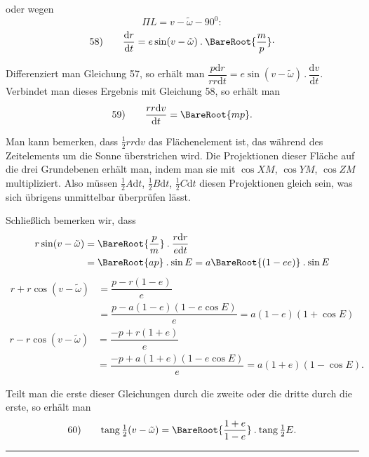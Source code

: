 oder wegen
\[
\Pi L=v-\tilde\omega-90^{0}:
\]
\[
\begin{array}{rl}58)\quad&\dfrac{\mathrm{d}r}{\mathrm{d}t}=e\sin(v-\tilde\omega)\mathbin{.}\BareRoot{\dfrac{m}{p}}\mathpunct{\cdot}\end{array}
\]
\par Differenziert man Gleichung 57, so erhält man \(\dfrac{p\mathrm{d}r}{rr\mathrm{d}t}=e\sin(v-\tilde\omega)\mathbin{.}\dfrac{\mathrm{d}v}{\mathrm{d}t}\). Verbindet man dieses Ergebnis mit Gleichung 58, so erhält man
\[
\begin{array}{rl}59)\quad&\dfrac{rr\mathrm{d}v}{\mathrm{d}t}=\BareRoot{mp}.\end{array}
\]
\par Man kann bemerken, dass \(\tfrac12rr\mathrm{d}v\) das Flächenelement ist, das während des Zeitelements um die Sonne überstrichen wird. Die Projektionen dieser Fläche auf die drei Grundebenen erhält man, indem man sie mit \(\cos XM\), \(\cos YM\), \(\cos ZM\) multipliziert. Also müssen \(\tfrac12A\mathrm{d}t\), \(\tfrac12B\mathrm{d}t\), \(\tfrac12C\mathrm{d}t\) diesen Projektionen gleich sein, was sich übrigens unmittelbar überprüfen lässt.
\par Schließlich bemerken wir, dass
\[
\begin{aligned}
r\sin(v-\tilde\omega)&=\BareRoot{\dfrac{p}{m}}\mathbin{.}\dfrac{r\mathrm{d}r}{e\mathrm{d}t}\\
&=\BareRoot{ap}\mathbin{.}\sin E=a\BareRoot{(1-ee)}\mathbin{.}\sin E
\end{aligned}
\]
\[
\begin{aligned}
r+r\cos(v-\tilde\omega)&=\dfrac{p-r(1-e)}{e}\\
&=\dfrac{p-a(1-e)(1-e\cos E)}{e}=a(1-e)(1+\cos E)
\end{aligned}
\]
\[
\begin{aligned}
r-r\cos(v-\tilde\omega)&=\dfrac{-p+r(1+e)}{e}\\
&=\dfrac{-p+a(1+e)(1-e\cos E)}{e}=a(1+e)(1-\cos E).
\end{aligned}
\]
\par Teilt man die erste dieser Gleichungen durch die zweite oder die dritte durch die erste, so erhält man
\[
\begin{array}{rl}60)\quad&\operatorname{tang}\tfrac12(v-\tilde\omega)=\BareRoot{\dfrac{1+e}{1-e}}\mathbin{.}\operatorname{tang}\tfrac12E.\end{array}
\]
\par\medskip\begin{center}\rule{.18\textwidth}{.3pt}\end{center}
